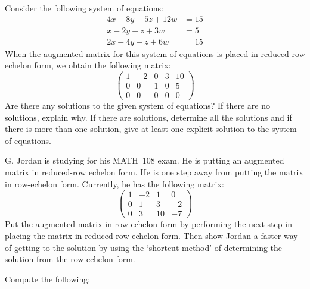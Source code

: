 \documentclass[12pt,letterpaper]{exam}
\begin{document}
\begin{questions}
\newpage
\question[10] Consider the following system of equations:
	\[
	\begin{aligned}
	4x - 8y - 5z + 12w&= 15 \\
	x - 2y - z + 3w&= 5 \\
	2x - 4y - z + 6w&= 15
	\end{aligned}
	\]
When the augmented matrix for this system of equations is placed in reduced-row echelon form, we obtain the following matrix:
	\[
	\begin{pmatrix}
	1 & -2 & 0 & 3 & 10 \\
	0 & 0 & 1 & 0 & 5 \\
	0 & 0 & 0 & 0 & 0 
	\end{pmatrix}
	\]
Are there any solutions to the given system of equations? If there are no solutions, explain why. If there are solutions, determine all the solutions and if there is more than one solution, give at least one explicit solution to the system of equations.  



\newpage
\question[10] G. Jordan is studying for his MATH~108 exam. He is putting an augmented matrix in reduced-row echelon form. He is one step away from putting the matrix in row-echelon form. Currently, he has the following matrix:
	\[
	\begin{pmatrix}
	1 & -2 & 1 & 0 \\
	0 & 1 & 3 & -2 \\
	0 & 3 & 10 & -7
	\end{pmatrix}
	\]
Put the augmented matrix in row-echelon form by performing the next step in placing the matrix in reduced-row echelon form. Then show Jordan a faster way of getting to the solution by using the `shortcut method' of determining the solution from the row-echelon form. 



\newpage
\question Compute the following:
	\begin{parts}
	\part[5]
		\[
		\begin{pmatrix} 2 & -3 \\ 5 & 1 \end{pmatrix} - 2 \begin{pmatrix} -2 & 0 \\ 1 & -3 \end{pmatrix}
		\] \vfill
	

\end{parts}
\end{questions}
\end{document}
